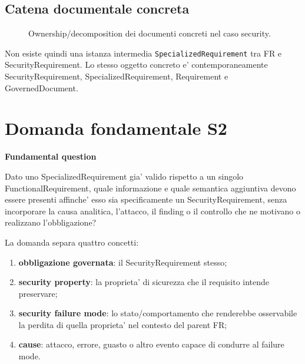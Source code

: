 \documentclass[11pt,a4paper]{article}
\newenvironment{statusbox}[1]{%
  \def\FrameCommand{\fcolorbox{ddtablue}{ddtagray}}%
  \MakeFramed{\advance\hsize-2\width\FrameRestore}
  \noindent\textbf{#1}\par\smallskip
}{\endMakeFramed}
\begin{document}
\subsection{Catena documentale concreta}

\begin{figure}[h]
\centering
{}
\caption{Ownership/decomposition dei documenti concreti nel caso security.}
\end{figure}

Non esiste quindi una istanza intermedia \texttt{SpecializedRequirement} tra FR e SecurityRequirement. Lo stesso oggetto concreto e' contemporaneamente SecurityRequirement, SpecializedRequirement, Requirement e GovernedDocument.

\section{Domanda fondamentale S2}

\begin{statusbox}{Fundamental question}
Dato uno SpecializedRequirement gia' valido rispetto a un singolo FunctionalRequirement, quale informazione e quale semantica aggiuntiva devono essere presenti affinche' esso sia specificamente un SecurityRequirement, senza incorporare la causa analitica, l'attacco, il finding o il controllo che ne motivano o realizzano l'obbligazione?
\end{statusbox}

La domanda separa quattro concetti:

\begin{enumerate}
  \item \textbf{obbligazione governata}: il SecurityRequirement stesso;
  \item \textbf{security property}: la proprieta' di sicurezza che il requisito intende preservare;
  \item \textbf{security failure mode}: lo stato/comportamento che renderebbe osservabile la perdita di quella proprieta' nel contesto del parent FR;
  \item \textbf{cause}: attacco, errore, guasto o altro evento capace di condurre al failure mode.
\end{enumerate}
\end{document}
